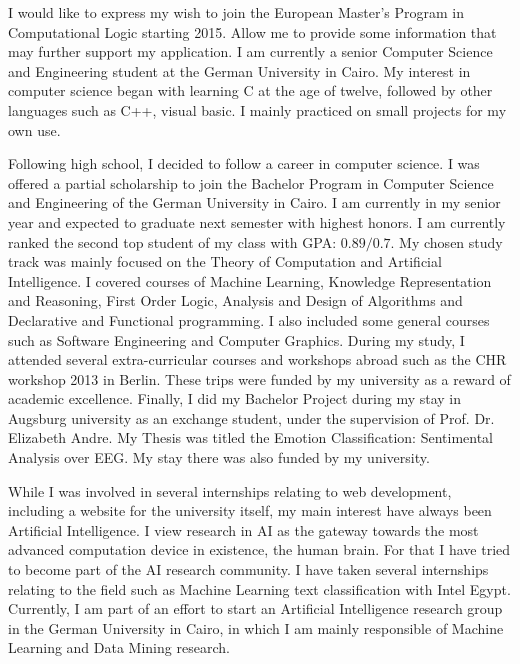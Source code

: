 \documentclass[10pt,stdletter,dateno,sigleft]{newlfm} %
\begin{document}
\begin{newlfm}


  I would like to express my wish to join the European Master's Program in
  Computational Logic starting 2015.
  Allow me to provide some information that may further support my application.
  I am currently a senior Computer Science and Engineering student at the German
  University in Cairo.  My interest in computer science began with learning C at the age of twelve,
  followed by other languages such as C++, visual basic. I mainly practiced on
  small projects for my own use.  

  Following high school, I decided to follow a career in computer science. I was
  offered a partial scholarship to join the Bachelor Program in Computer Science
  and Engineering of the German University in Cairo. I am currently in my senior
  year and expected to graduate next semester with highest honors. I am
  currently ranked the second top student of my class with GPA: $0.89/0.7$. My
  chosen study track was mainly focused on the Theory of Computation and
  Artificial Intelligence. I covered courses of Machine Learning, Knowledge
  Representation and Reasoning, First Order Logic, Analysis and Design of
  Algorithms and Declarative and Functional
  programming. I also included some general courses such as Software Engineering
  and Computer Graphics. During my study, I attended several extra-curricular courses and
  workshops abroad such as the CHR workshop 2013 in Berlin. These trips were
  funded by my university as a reward of academic excellence. Finally, I did my
  Bachelor Project during my stay in Augsburg university as an exchange student,
  under the supervision of Prof. Dr. Elizabeth Andre. My Thesis was titled the
  Emotion Classification: Sentimental Analysis over EEG. My stay there was also
  funded by my university.

  While I was involved in several internships relating to web development,
  including a website for the university itself, my main interest have always
  been Artificial Intelligence. I view research in AI as the gateway towards the
  most advanced computation device in existence, the human brain. For that I have
  tried to become part of the AI research community. I have taken several
  internships relating to the field such as Machine Learning text classification
  with Intel Egypt. Currently, I am part of an effort to start an Artificial
  Intelligence research group in the German University in Cairo, in which I am
  mainly responsible of Machine Learning and Data Mining research.
  

\end{newlfm}
\end{document}
